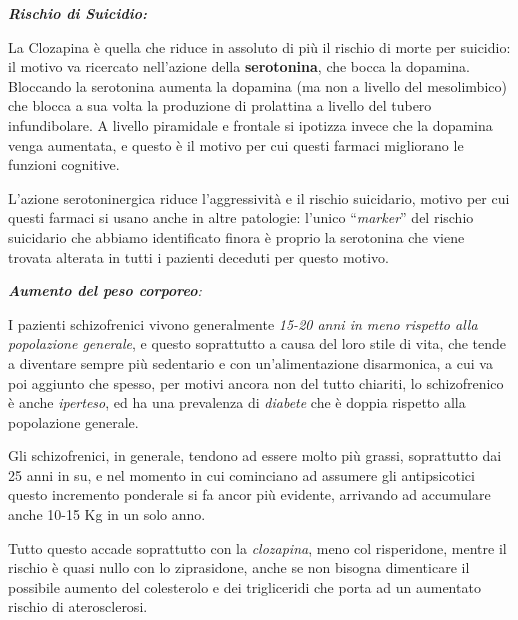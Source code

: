 \textbf{\emph{Rischio di Suicidio:}}

La Clozapina è quella che riduce in assoluto di più il rischio di morte
per suicidio: il motivo va ricercato nell'azione della
\textbf{serotonina}, che bocca la dopamina. Bloccando la serotonina
aumenta la dopamina (ma non a livello del mesolimbico) che blocca a sua
volta la produzione di prolattina a livello del tubero infundibolare. A
livello piramidale e frontale si ipotizza invece che la dopamina venga
aumentata, e questo è il motivo per cui questi farmaci migliorano le
funzioni cognitive.

L'azione serotoninergica riduce l'aggressività e il rischio suicidario,
motivo per cui questi farmaci si usano anche in altre patologie: l'unico
``\emph{marker}'' del rischio suicidario che abbiamo identificato finora
è proprio la serotonina che viene trovata alterata in tutti i pazienti
deceduti per questo motivo.

\emph{\textbf{Aumento del peso corporeo}:}

I pazienti schizofrenici vivono generalmente \emph{15-20 anni in meno
rispetto alla popolazione generale}, e questo soprattutto a causa del
loro stile di vita, che tende a diventare sempre più sedentario e con
un'alimentazione disarmonica, a cui va poi aggiunto che spesso, per
motivi ancora non del tutto chiariti, lo schizofrenico è anche
\emph{iperteso}, ed ha una prevalenza di \emph{diabete} che è doppia
rispetto alla popolazione generale.

Gli schizofrenici, in generale, tendono ad essere molto più grassi,
soprattutto dai 25 anni in su, e nel momento in cui cominciano ad
assumere gli antipsicotici questo incremento ponderale si fa ancor più
evidente, arrivando ad accumulare anche 10-15 Kg in un solo anno.

Tutto questo accade soprattutto con la \emph{clozapina}, meno col
risperidone, mentre il rischio è quasi nullo con lo ziprasidone, anche
se non bisogna dimenticare il possibile aumento del colesterolo e dei
trigliceridi che porta ad un aumentato rischio di aterosclerosi.

